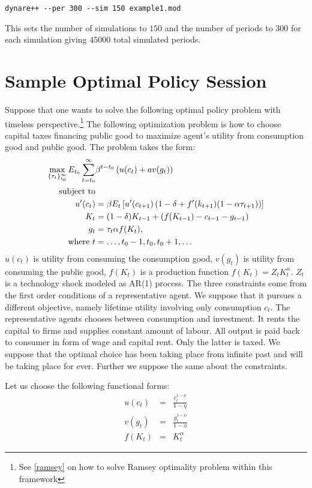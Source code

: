\documentclass[10pt]{article}
\begin{document}
{\small
\begin{verbatim}
dynare++ --per 300 --sim 150 example1.mod
\end{verbatim}
}

\noindent This sets the number of simulations to $150$ and the number
of periods to $300$ for each simulation giving $45000$ total simulated
periods.

\section{Sample Optimal Policy Session}
\label{optim_tut}

Suppose that one wants to solve the following optimal policy problem
with timeless perspective.\footnote{See \ref{ramsey} on how to solve
Ramsey optimality problem within this framework} The following
optimization problem is how to choose capital taxes financing public
good to maximize agent's utility from consumption good and public
good. The problem takes the form:
\begin{align*}
\max_{\{\tau_t\}_{t_0}^\infty} 
E_{t_0}\sum_{t=t_0}^\infty &\beta^{t-t_0}\left(u(c_t)+av(g_t)\right)\\
\hbox{subject\ to}&\\
u'(c_t) &=
\beta E_t\left[u'(c_{t+1})\left(1-\delta+f'(k_{t+1})(1-\alpha\tau_{t+1})\right)\right]\\
K_t &= (1-\delta)K_{t-1} + (f(K_{t-1}) - c_{t-1} - g_{t-1})\\
g_t &= \tau_t\alpha f(K_t),\\
\hbox{where\ } t & = \ldots,t_0-1,t_0,t_0+1,\ldots
\end{align*}
$u(c_t)$ is utility from consuming the consumption good, $v(g_t)$ is
utility from consuming the public good, $f(K_t)$ is a production
function $f(K_t) = Z_tK_t^\alpha$. $Z_t$ is a technology shock modeled
as AR(1) process. The three constraints come from the first order
conditions of a representative agent. We suppose that it pursues a
different objective, namely lifetime utility involving only
consumption $c_t$. The representative agents chooses between
consumption and investment. It rents the capital to firms and supplies
constant amount of labour. All output is paid back to consumer in form
of wage and capital rent. Only the latter is taxed. We suppose that
the optimal choice has been taking place from infinite past and will
be taking place for ever. Further we suppose the same about the
constraints.

Let us choose the following functional forms:
\begin{eqnarray*}
u(c_t) &=& \frac{c_t^{1-\eta}}{1-\eta}\\
v(g_t) &=& \frac{g_t^{1-\phi}}{1-\phi}\\
f(K_t) &=& K_t^\alpha
\end{eqnarray*}
\end{document}
